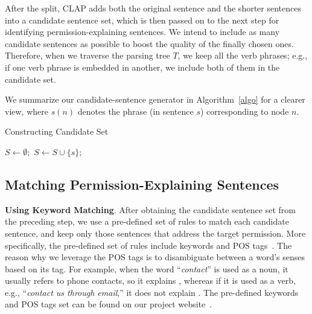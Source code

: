 After the split, CLAP adds both the original sentence and the shorter sentences into a candidate sentence set, which is then passed on to the next step for identifying permission-explaining sentences. 
We intend to include as many candidate sentences as possible to boost the quality of the finally chosen ones. 
Therefore, when we traverse the parsing tree $T$, we keep all the verb phrases; e.g., if one verb phrase is embedded in another, we include both of them in the candidate set. 

We summarize our candidate-sentence generator in Algorithm~\ref{algo} for a clearer view, where $s(n)$ denotes the phrase (in sentence $s$) corresponding to node $n$. 

\begin{algorithm}
\caption{Constructing Candidate Set\label{algo}}
\DontPrintSemicolon
  $S\leftarrow\emptyset;$\;
  $S\leftarrow S \cup \{s\}$;
\end{algorithm}
\vspace{-0.2in}

\subsection{Matching Permission-Explaining Sentences}
\label{sec:keywords}

\textbf{Using Keyword Matching}. After obtaining the candidate sentence set from the preceding step, we use a pre-defined set of rules to match each candidate sentence, and keep only those sentences that address the target permission. 
More specifically, the pre-defined set of rules include keywords and POS tags~\cite{conf/naacl/ToutanovaKMS03}. 
The reason why we leverage the POS tags is to disambiguate between a word's senses based on its tag. 
For example, when the word ``\emph{contact}'' is used as a noun, it usually refers to phone contacts, so it explains , whereas if it is used as a verb, e.g., ``\emph{contact us through email},'' it does not explain . 
The pre-defined keywords and POS tags set can be found on our project website~\cite{clapproj}. 

